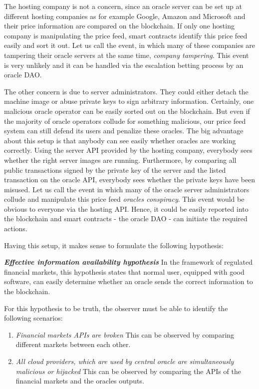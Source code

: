 \documentclass[a4paper]{article}
\begin{document}
The hosting company is not a concern, since an oracle server can be set up at different hosting companies as for example Google, Amazon and Microsoft and their price information are compared on the blockchain. If only one hosting company is manipulating the price feed, smart contracts identify this price feed easily and sort it out. Let us call the event, in which many of these companies are tampering their oracle servers at the same time, \emph{company tampering}\label{Tampering}. This event is very unlikely and it can be handled via the escalation betting process by an oracle DAO.

The other concern is due to server administrators. They could either detach the machine image or abuse private keys to sign arbitrary information. Certainly, one malicious oracle operator can be easily sorted out on the blockchain. But even if the majority of oracle operators collude for something malicious, our price feed system can still defend its users and penalize these oracles. The big advantage about this setup is that anybody can see easily whether oracles are working correctly. Using the server API provided by the hosting company, everybody sees whether the right server images are running. Furthermore, by comparing all public transactions signed by the private key of the server and the listed transaction on the oracle API, everybody sees whether the private keys have been misused. Let us call the event in which many of the oracle server administrators collude and manipulate this price feed \emph{oracles conspiracy}. This event would be obvious to everyone via the hosting API. Hence, it could be easily reported into the blockchain and smart contracts - the oracle DAO - can initiate the required actions. 

Having this setup, it makes sense to formulate the following hypothesis: \label{effectiveinformationhypothesis}


\textbf{\textit{Effective information availability hypothesis}}
In the framework of regulated financial markets, this hypothesis states that normal user, equipped with good software, can easily determine whether an oracle sends the correct information to the blockchain.

For this hypothesis to be truth, the observer must be able to identify the following scenarios:

\begin{enumerate}
\item \textit{Financial markets APIs are broken}
This can be observed by comparing different markets between each other.
\item \textit{All cloud providers, which are used by central oracle are simultaneously malicious or hijacked }
This can be observed by comparing the APIs of the financial markets and the oracles outputs.
\end{enumerate}
\end{document}
